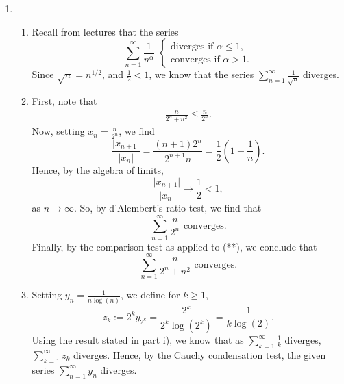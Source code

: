 \documentclass[
  17pt,
  a4paper]{extarticle}
\providecommand{\tightlist}{%
  \setlength{\itemsep}{0pt}\setlength{\parskip}{0pt}}
\theoremstyle{plain}
\theoremstyle{definition}
\theoremstyle{plain}
\theoremstyle{plain}
\theoremstyle{plain}
\theoremstyle{plain}
\theoremstyle{definition}
\theoremstyle{definition}
\theoremstyle{remark}
\theoremstyle{remark}
\renewcommand{\;}{\,}
\begin{document}
\begin{enumerate}
\begin{enumerate}
  \end{enumerate}
\item
  \begin{enumerate}
  \def\labelenumii{\roman{enumii})}
  \tightlist
  \item
    Recall from lectures that the series \[\sum_{n=1}^{\infty} \frac{1}{n^{\alpha}}\;\;\begin{cases}\text{diverges if}\;\; \alpha \leq 1,\\
    \text{converges if}\;\; \alpha > 1.
    \end{cases}\] Since \(\sqrt{n} = n^{1/2}\), and \(\frac{1}{2}<1\), we know that the series \(\sum_{n=1}^{\infty}\frac{1}{\sqrt{n}}\) diverges.
  \item
    First, note that
    \begin{align}
    \frac{n}{2^n + n^2} \leq \frac{n}{2^n}.\tag{**}
    \end{align}
    Now, setting \(x_n = \frac{n}{2^n}\), we find \[\frac{\lvert x_{n+1}\rvert}{\lvert x_n \rvert} = \frac{(n+1)2^n}{2^{n+1}n} = \frac{1}{2}\left(1 + \frac{1}{n}\right).\] Hence, by the algebra of limits, \[\frac{\lvert x_{n+1}\rvert}{\lvert x_n \rvert} \to \frac{1}{2} < 1,\] as \(n \to \infty\). So, by d'Alembert's ratio test, we find that \[\sum_{n=1}^{\infty}\frac{n}{2^n} \; \; \text{converges.}\] Finally, by the comparison test as applied to (**), we conclude that \[\sum_{n=1}^{\infty}\frac{n}{2^n + n^2} \; \; \text{converges.}\]
  \item
    Setting \(y_n = \frac{1}{n\log(n)}\), we define for \(k \geq 1,\) \[z_{k}:= 2^k y_{2^k} = \frac{2^k}{2^k\log(2^k)} = \frac{1}{k\log(2)}.\] Using the result stated in part i), we know that as \(\sum_{k=1}^{\infty}\frac{1}{k}\) diverges, \(\sum_{k=1}^{\infty} z_k\) diverges. Hence, by the Cauchy condensation test, the given series \(\sum_{n=1}^{\infty}y_n\) diverges.
  \end{enumerate}
\end{enumerate}
\end{document}
